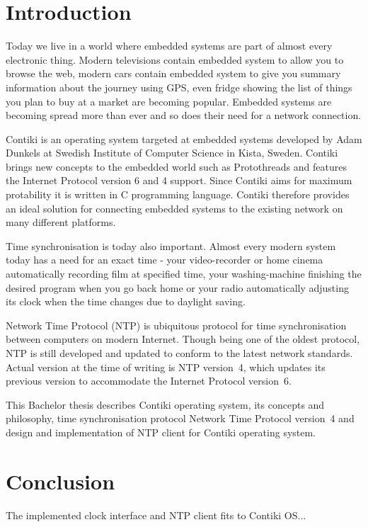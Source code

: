 
\chapter{Introduction}
Today we live in a world where embedded systems are part of almost every electronic thing. Modern televisions
contain embedded system to allow you to browse the web, modern cars contain embedded system to give you summary information
about the journey using GPS, even fridge showing the list of things you plan to buy at a market are becoming popular.
Embedded systems are becoming spread more than ever and so does
their need for a network connection.

Contiki is an operating system targeted at embedded systems
developed by Adam Dunkels at Swedish Institute of Computer Science in Kista, Sweden.
Contiki brings new concepts to the embedded world such as Protothreads and features
the Internet Protocol version 6 and 4 support.
Since Contiki aims for maximum protability it is written in C programming language.
Contiki therefore provides an ideal solution for connecting
embedded systems to the existing network on many different platforms.

Time synchronisation is today also important.
Almost every modern system today has a need for an exact time -
your video-recorder or home cinema automatically recording film at specified time, your washing-machine finishing the
desired program when you go back home or your radio automatically adjusting its clock when the time changes
due to daylight saving.

Network Time Protocol (NTP) is ubiquitous protocol for time synchronisation between computers on modern Internet.
Though being one of the oldest protocol, NTP is still developed and updated to conform to the latest
network standards. Actual version at the time of writing is NTP version~4, which updates its previous version to
accommodate the Internet Protocol version~6.

This Bachelor thesis describes Contiki operating system, its concepts and philosophy, time synchronisation protocol
Network Time Protocol version~4 and design and implementation of NTP client for Contiki operating system.








\chapter{Conclusion}
The implemented clock interface and NTP client fits to Contiki OS...
